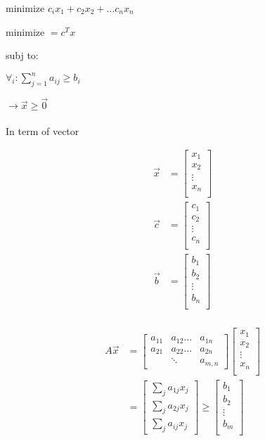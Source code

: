 \documentclass[12pt]{article}
\begin{document}
  minimize $c_ix_1+c_2x_2+\dots c_nx_n$
  
   minimize  $= c^Tx$
   
   subj to:
   
   $\forall_i: \sum_{j=1}^n a_{ij}\geq b_i$
   
     $\to \vec{x} \geq \vec{0}$\\\\
   In term of vector
   
   \begin{multicols}{2}
   	  \begin{align*}
   	\vec{x}&=
   	\begin{bmatrix}
   	x_1\\
   	x_2\\
   	\vdots\\
   	x_n\\
   	\end{bmatrix}\\
   	\vec{c}&=
   	\begin{bmatrix}
   	c_1\\
   	c_2\\
   	\vdots\\
   	c_n\\
   	\end{bmatrix}\\
   	\vec{b}&=
   	\begin{bmatrix}
   	b_1\\
   	b_2\\
   	\vdots\\
   	b_n\\
   	\end{bmatrix}\\
   	\end{align*}
   	
   	\columnbreak
   \begin{align*}
   A\vec{x}&=
   \begin{bmatrix}
   a_{11} &a_{12} \dots &a_{1n}\\
   a_{21} &a_{22} \dots &a_{2n}\\
   &\ddots &a_{m,n}
   \end{bmatrix}
   \begin{bmatrix}
   x_1\\
   x_2\\
   \vdots\\
   x_n\\
   \end{bmatrix}\\
   &=\begin{bmatrix}
   \sum_ja_{1j}x_j\\
   \sum_ja_{2j}x_j\\
   \sum_ja_{ij}x_j
   \end{bmatrix}
   \geq
   \begin{bmatrix}
   b_1\\
   b_2\\
   \vdots\\
   b_m\\
   \end{bmatrix}\\
   \end{align*}
   	\end{multicols}
\end{document}
